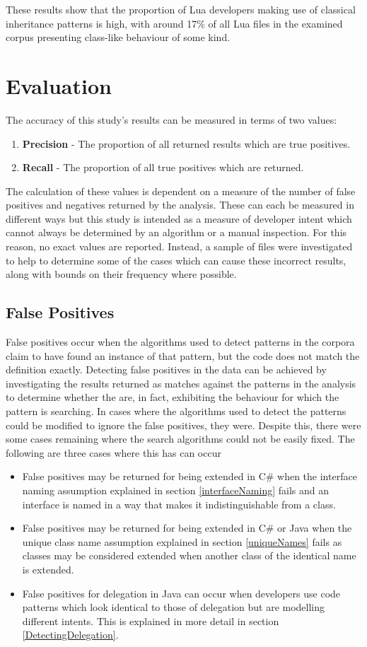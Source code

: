 These results show that the proportion of Lua developers making use of classical inheritance patterns is high, with around 17\% of all Lua files in the examined corpus presenting class-like behaviour of some kind.

\section{Evaluation}
The accuracy of this study's results can be measured in terms of two values:
\begin{enumerate}
	\item \textbf{Precision} - The proportion of all returned results which are true positives.
	\item \textbf{Recall} - The proportion of all true positives which are returned.
\end{enumerate}
The calculation of these values is dependent on a measure of the number of false positives and negatives returned by the analysis. These can each be measured in different ways but this study is intended as a measure of developer intent which cannot always be determined by an algorithm or a manual inspection. For this reason, no exact values are reported. Instead, a sample of files were investigated to help to determine some of the cases which can cause these incorrect results, along with bounds on their frequency where possible.

\subsection{False Positives}
\label{falsePositives}
False positives occur when the algorithms used to detect patterns in the corpora claim to have found an instance of that pattern, but the code does not match the definition exactly. Detecting false positives in the data can be achieved by investigating the results returned as matches against the patterns in the analysis to determine whether the are, in fact, exhibiting the behaviour for which the pattern is searching. In cases where the algorithms used to detect the patterns could be modified to ignore the false positives, they were. Despite this, there were some cases remaining where the search algorithms could not be easily fixed. The following are three cases where this has can occur
\begin{itemize}
	\item False positives may be returned for being extended in C\# when the interface naming assumption explained in section \ref{interfaceNaming} fails and an interface is named in a way that makes it indistinguishable from a class.
	\item False positives may be returned for being extended in C\# or Java when the unique class name assumption explained in section \ref{uniqueNames} fails as classes may be considered extended when another class of the identical name is extended.
	\item False positives for delegation in Java can occur when developers use code patterns which look identical to those of delegation but are modelling different intents. This is explained in more detail in section \ref{DetectingDelegation}.
\end{itemize} 

